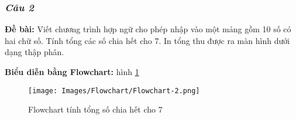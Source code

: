 \subsubsection{\textit{Câu 2}}

\noindent\textbf{\large Đề bài:} Viết chương trình hợp ngữ cho phép nhập vào một mảng gồm 10 số có hai chữ số. Tính tổng các số chia hết cho 7. In tổng thu được ra màn hình dưới dạng thập phân.

\vspace{0.5cm}
\noindent\textbf{\large Biểu diễn bằng Flowchart:} hình \ref{fig:flowchart-2}

\begin{figure}[H]
    \centering
    \texttt{[image: Images/Flowchart/Flowchart-2.png]}
    \caption{Flowchart tính tổng số chia hết cho 7}
    \label{fig:flowchart-2}
\end{figure}

